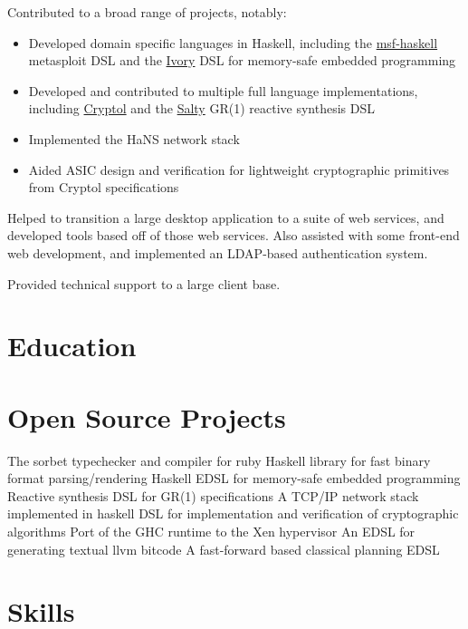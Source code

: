 \documentclass[letter,10pt]{moderncv}
\begin{document}
  {}{Contributed to a broad range of projects, notably:
  \begin{itemize}%
  \item Developed domain specific languages in Haskell, including the
    \href{https://github.com/galoisinc/msf-haskell}{msf-haskell} metasploit DSL
    and the \href{https://github.com/galoisinc/ivory}{Ivory} DSL for memory-safe
    embedded programming
  \item Developed and contributed to multiple full language implementations,
    including \href{https://github.com/galoisinc/cryptol}{Cryptol} and the
    \href{https://github.com/galoisinc/salty}{Salty} GR(1) reactive synthesis DSL
  \item Implemented the HaNS network stack
  \item Aided ASIC design and verification for lightweight cryptographic
    primitives from Cryptol specifications
  \end{itemize}}

  {}{Helped to transition a large desktop application to a suite of web
  services, and developed tools based off of those web services. Also assisted
  with some front-end web development, and implemented an LDAP-based
  authentication system.}

  {}{Provided technical support to a large client base.}

\section{Education}


\section{Open Source Projects}
  {The sorbet typechecker and compiler for ruby}
  {Haskell library for fast binary format parsing/rendering}
  {Haskell EDSL for memory-safe embedded programming}
  {Reactive synthesis DSL for GR(1) specifications}
  {A TCP/IP network stack implemented in haskell}
  {DSL for implementation and verification of cryptographic algorithms}
  {Port of the GHC runtime to the Xen hypervisor}
  {An EDSL for generating textual llvm bitcode}
  {A fast-forward based classical planning EDSL}

\section{Skills}

\printbibliography[title=Publications]
\end{document}
